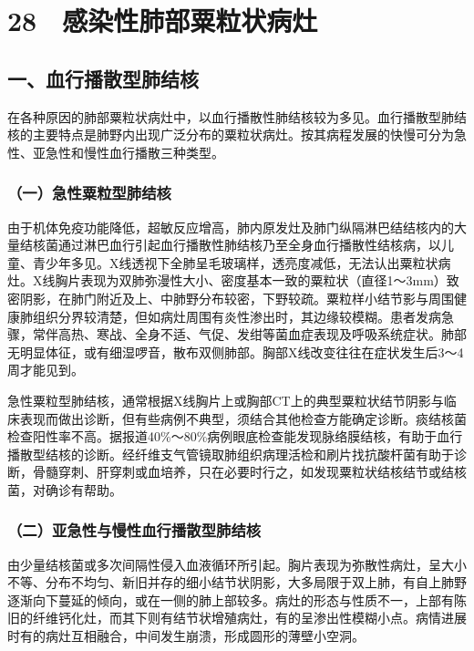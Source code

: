 \protect\hypertarget{text00085.html}{}{}

\section{28　感染性肺部粟粒状病灶}

\subsection{一、血行播散型肺结核}

在各种原因的肺部粟粒状病灶中，以血行播散性肺结核较为多见。血行播散型肺结核的主要特点是肺野内出现广泛分布的粟粒状病灶。按其病程发展的快慢可分为急性、亚急性和慢性血行播散三种类型。

\subsubsection{（一）急性粟粒型肺结核}

由于机体免疫功能降低，超敏反应增高，肺内原发灶及肺门纵隔淋巴结结核内的大量结核菌通过淋巴血行引起血行播散性肺结核乃至全身血行播散性结核病，以儿童、青少年多见。X线透视下全肺呈毛玻璃样，透亮度减低，无法认出粟粒状病灶。X线胸片表现为双肺弥漫性大小、密度基本一致的粟粒状（直径1～3mm）致密阴影，在肺门附近及上、中肺野分布较密，下野较疏。粟粒样小结节影与周围健康肺组织分界较清楚，但如病灶周围有炎性渗出时，其边缘较模糊。患者发病急骤，常伴高热、寒战、全身不适、气促、发绀等菌血症表现及呼吸系统症状。肺部无明显体征，或有细湿啰音，散布双侧肺部。胸部X线改变往往在症状发生后3～4周才能见到。

急性粟粒型肺结核，通常根据X线胸片上或胸部CT上的典型粟粒状结节阴影与临床表现而做出诊断，但有些病例不典型，须结合其他检查方能确定诊断。痰结核菌检查阳性率不高。据报道40\%～80\%病例眼底检查能发现脉络膜结核，有助于血行播散型结核的诊断。经纤维支气管镜取肺组织病理活检和刷片找抗酸杆菌有助于诊断，骨髓穿刺、肝穿刺或血培养，只在必要时行之，如发现粟粒状结核结节或结核菌，对确诊有帮助。

\subsubsection{（二）亚急性与慢性血行播散型肺结核}

由少量结核菌或多次间隔性侵入血液循环所引起。胸片表现为弥散性病灶，呈大小不等、分布不均匀、新旧并存的细小结节状阴影，大多局限于双上肺，有自上肺野逐渐向下蔓延的倾向，或在一侧的肺上部较多。病灶的形态与性质不一，上部有陈旧的纤维钙化灶，而其下则有结节状增殖病灶，有的呈渗出性模糊小点。病情进展时有的病灶互相融合，中间发生崩溃，形成圆形的薄壁小空洞。

